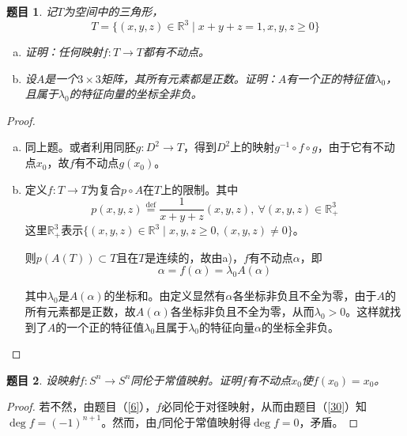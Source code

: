 \documentclass[UTF-8,11pt,fancyhdr,hyperref,titlepage]{ctexart}
\theoremstyle{question}
\newtheorem{timu}{题目}
\theoremstyle{theorem}
\theoremstyle{definition}
\theoremstyle{remark}
\def\RR{{\mathbb R}}
\def\longto{\longrightarrow}
\def\To{\longto}
\newcommand{\defeq}{\stackrel{{\mathrm{def}}}{=}}
\begin{document}
\begin{timu}\label{20}
  记$T$为空间中的三角形，
  \begin{equation*}
  T=\{(x,y,z)\in\RR^3\mid x+y+z=1,x,y,z\geqslant0\}
  \end{equation*}
  \begin{enumerate}[a)]
    \setlength{\itemindent}{2ex}
    \item 证明：任何映射$f\colon T\To T$都有不动点。
    \item 设$A$是一个$3\times3$矩阵，其所有元素都是正数。证明：$A$有一个正的特征值$\lambda_0$，且属于$\lambda_0$的特征向量的坐标全非负。
  \end{enumerate}
\end{timu}
\begin{proof}
  \begin{enumerate}[a)]
    \setlength{\itemindent}{2ex}
    \item 同上题。或者利用同胚$g\colon D^2\To T$，得到$D^2$上的映射$g^{-1}\circ f\circ g$，由于它有不动点$x_0$，故$f$有不动点$g(x_0)$。
    \item 定义$f\colon T\To T$为复合$p\circ A$在$T$上的限制。其中
    \begin{equation*}
      p(x,y,z)\defeq\frac{1}{x+y+z}(x,y,z),\ \forall(x,y,z)\in\RR^3_{+}
    \end{equation*}
    这里$\RR^3_{+}$表示$\{(x,y,z)\in\RR^3\mid x,y,z\geqslant0, (x,y,z)\neq0\}$。
    
    则$p(A(T))\subset T$且在$T$是连续的，故由a)，$f$有不动点$\alpha$，即
    \begin{equation*}
      \alpha=f(\alpha)=\lambda_0 A(\alpha)
    \end{equation*}
    
    其中$\lambda_0$是$A(\alpha)$的坐标和。由定义显然有$\alpha$各坐标非负且不全为零，由于$A$的所有元素都是正数，故$A(\alpha)$各坐标非负且不全为零，从而$\lambda_0>0$。这样就找到了$A$的一个正的特征值$\lambda_0$且属于$\lambda_0$的特征向量$\alpha$的坐标全非负。
  \end{enumerate}
\end{proof}

\begin{timu}\label{21}
  设映射$f\colon S^n\To S^n$同伦于常值映射。证明$f$有不动点$x_0$使$f(x_0)=x_0$。
\end{timu}
\begin{proof}
  若不然，由题目（\ref{6}），$f$必同伦于对径映射，从而由题目（\ref{30}）知$\deg f=(-1)^{n+1}$。然而，由$f$同伦于常值映射得$\deg f=0$，矛盾。
\end{proof}
\end{document}
